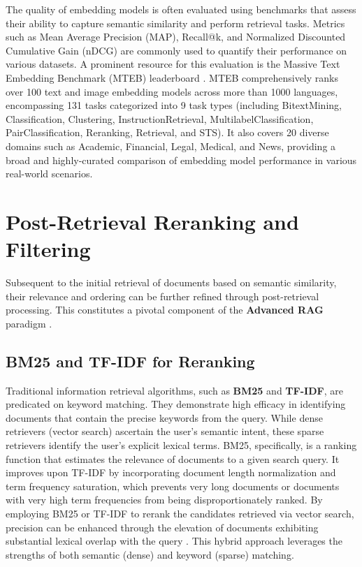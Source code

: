 The quality of embedding models is often evaluated using benchmarks that assess their ability to capture semantic similarity and perform retrieval tasks. Metrics such as Mean Average Precision (MAP), Recall@k, and Normalized Discounted Cumulative Gain (nDCG) are commonly used to quantify their performance on various datasets. A prominent resource for this evaluation is the Massive Text Embedding Benchmark (MTEB) leaderboard \autocite{mteb_leaderboard_2025}. MTEB comprehensively ranks over 100 text and image embedding models across more than 1000 languages, encompassing 131 tasks categorized into 9 task types (including BitextMining, Classification, Clustering, InstructionRetrieval, MultilabelClassification, PairClassification, Reranking, Retrieval, and STS). It also covers 20 diverse domains such as Academic, Financial, Legal, Medical, and News, providing a broad and highly-curated comparison of embedding model performance in various real-world scenarios.

\section{Post-Retrieval Reranking and Filtering}
Subsequent to the initial retrieval of documents based on semantic similarity, their relevance and ordering can be further refined through post-retrieval processing. This constitutes a pivotal component of the \textbf{Advanced RAG} paradigm \autocite{gao2024retrievalaugmented}.

\subsection{BM25 and TF-IDF for Reranking}
Traditional information retrieval algorithms, such as \textbf{BM25} \autocite{robertson1995okapi} and \textbf{TF-IDF}, are predicated on keyword matching. They demonstrate high efficacy in identifying documents that contain the precise keywords from the query. While dense retrievers (vector search) ascertain the user's semantic intent, these sparse retrievers identify the user's explicit lexical terms. BM25, specifically, is a ranking function that estimates the relevance of documents to a given search query. It improves upon TF-IDF by incorporating document length normalization and term frequency saturation, which prevents very long documents or documents with very high term frequencies from being disproportionately ranked. By employing BM25 or TF-IDF to rerank the candidates retrieved via vector search, precision can be enhanced through the elevation of documents exhibiting substantial lexical overlap with the query \autocite{gao2024retrievalaugmented}. This hybrid approach leverages the strengths of both semantic (dense) and keyword (sparse) matching.

